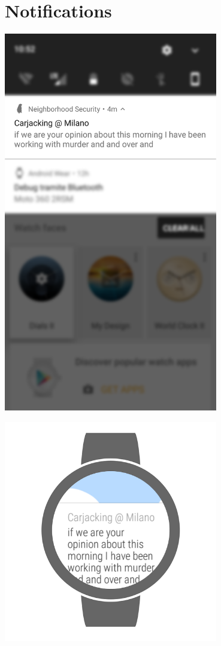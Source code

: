 \documentclass[a4paper]{scrreprt}
\begin{document}
\section{Notifications}
\begin{minipage}{0.33\textwidth}
	\centering
	\includegraphics[width=0.7\textwidth]{imgs/notification_android.png}
\end{minipage}
\begin{minipage}{0.33\textwidth}
	\centering
	\includegraphics[width=0.7\textwidth]{imgs/notification_wear_text.png}
\end{minipage}
\end{document}
